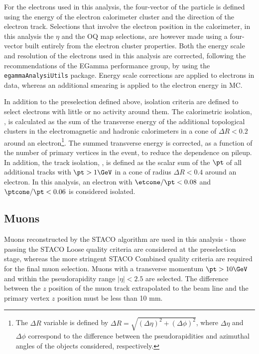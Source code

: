 For the electrons used in this analysis, the four-vector of the
particle is defined using the energy of the electron calorimeter
cluster and the direction of the electron track. Selections that
involve the electron position in the calorimeter, in this analysis the
$\eta$ and the OQ map selections, are however made using a four-vector built
entirely from the electron cluster properties. Both the energy scale
and resolution of the electrons used in this analysis are corrected,
following the recommendations of the EGamma performance group, by
using the {\tt egammaAnalysiUtils}
package\cite{EGammaRecomendations}. Energy scale corrections are
applied to electrons in data, whereas an additional smearing is
applied to the electron energy in MC.

In addition to the preselection defined above, isolation criteria are
defined to select electrons with little or no activity around
them. The calorimetric isolation, \etcone, is calculated as the sum of
the transverse energy of the additional topological clusters in the
electromagnetic and hadronic calorimeters in a cone of $\Delta R <
0.2$ around an electron\footnote{The $\Delta R$ variable is defined by
$\Delta R=\sqrt{(\Delta\eta)^2+(\Delta\phi)^2}$, where $\Delta \eta$
and $\Delta \phi$ correspond to the difference between
the pseudorapidities and azimuthal angles of the objects considered, respectively.}. 
The summed transverse energy is corrected, as a function of the
number of primary vertices in the event, to reduce the dependence on
pileup. In addition, the track isolation, \ptcone, is defined as the
scalar sum of the $\pt$ of all additional tracks with $\pt>1\GeV$ in a
cone of radius $\Delta R<0.4$ around an electron. In this analysis, an
electron with $\etcone/\pt<0.08$ and $\ptcone/\pt<0.06$ is considered isolated.


\subsection{Muons}
\label{sec:presel:muon}

Muons reconstructed by the STACO algorithm \cite{AtlasCSCBook} are
used in this analysis - those passing the STACO Loose quality criteria
are considered at the preselection stage, whereas the more stringent
STACO Combined quality criteria are required for the final muon
selection. Muons with a transverse momentum $\pt > 10\GeV$ and
within the pseudorapidity range $|\eta| < 2.5$ are selected. The
difference between the $z$ position of the muon track extrapolated to
the beam line and the primary vertex $z$ position must be less than 10
mm. 

